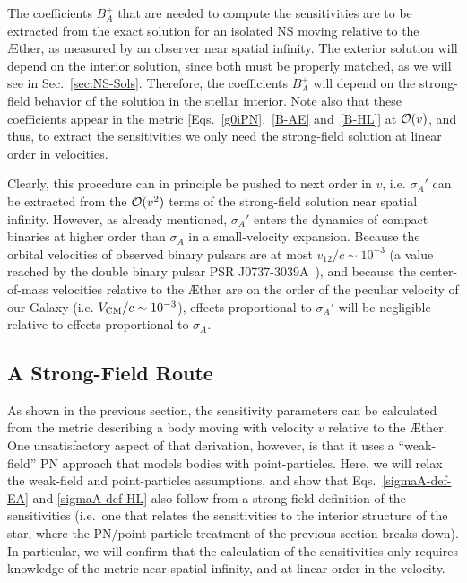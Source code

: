 \documentclass[prd,aps,twocolumn,nofootinbib,showpacs,superscriptaddress]{revtex4-1}
\begin{document}
The coefficients $B_{A}^{\pm}$ that are needed to compute the sensitivities are to be extracted 
from the exact solution for an isolated NS moving relative to the \AE ther, as measured by an observer
near spatial infinity. The exterior solution will depend on the interior solution, since both must be properly
matched, as we will see in Sec.~\ref{sec:NS-Sols}. 
Therefore, the coefficients $B_{A}^{\pm}$ will 
depend on the strong-field behavior of the solution in the stellar interior. Note also that these coefficients
appear in the metric [Eqs.~\eqref{g0iPN},~\eqref{B-AE} and~\eqref{B-HL}] at ${\cal{O}}(v)$, and thus, 
to extract the sensitivities we only need the strong-field solution at linear order in velocities. 

Clearly, this procedure can in principle be pushed to next order in $v$, i.e.
$\sigma_A'$ can be extracted from the ${\cal O}(v^2)$ terms of the strong-field solution
near spatial infinity. However, as already mentioned, $\sigma_A'$ enters the dynamics
of compact binaries at higher order than $\sigma_A$ in a small-velocity expansion. Because
the orbital velocities of observed binary pulsars are at most $v_{12}/c \sim 10^{-3}$ 
(a value reached by the double binary pulsar PSR J0737-3039A~\cite{manchester,kramer-double-pulsar,burgay,kramer-wex}),
and because the center-of-mass velocities relative to the \AE ther are on the order of the peculiar velocity
of our Galaxy (i.e. $V_{\rm CM}/c \sim 10^{-3}$), effects proportional to $\sigma_A'$ will be negligible 
relative to effects proportional to $\sigma_{A}$. 

\subsection{A Strong-Field Route}
\label{sec:strongf}

As shown in the previous section, the sensitivity parameters can be calculated from the metric
describing a body moving with velocity $v$ relative to the \AE ther.
One unsatisfactory aspect of that derivation, however, is that it uses a ``weak-field''
PN approach that models bodies with point-particles. Here, we will 
relax the weak-field and point-particles assumptions, and show that Eqs.~\eqref{sigmaA-def-EA}
and \eqref{sigmaA-def-HL} also follow from a strong-field definition of the sensitivities 
(i.e.~one that relates the sensitivities to the interior structure of the star,
where the PN/point-particle treatment of the previous section breaks down).
In particular, we will confirm that the calculation of the sensitivities only requires 
knowledge of the metric near spatial infinity, and at linear order in the velocity. 
\end{document}
